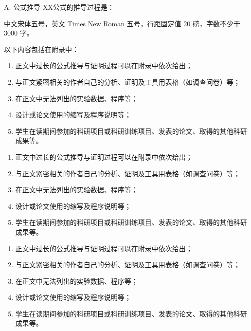 \documentclass{document}
\begin{document}
\clearpage

\printbibliography

\begin{cquappendix}{A: 公式推导}
    XX公式的推导过程是：
    
    中文宋体五号，英文 Times New Roman 五号，行距固定值 20 磅，字数不少于 3000 字。
    
    以下内容包括在附录中：
    \begin{enumerate}
        \item 正文中过长的公式推导与证明过程可以在附录中依次给出；
        \item 与正文紧密相关的作者自己的分析、证明及工具用表格（如调查问卷）等；
        \item 在正文中无法列出的实验数据、程序等；
        \item 设计或论文使用的缩写及程序说明等；
        \item 学生在读期间参加的科研项目或科研训练项目、发表的论文、取得的其他科研成果等。
    \end{enumerate}

    \begin{enumerate}
        \item 正文中过长的公式推导与证明过程可以在附录中依次给出；
        \item 与正文紧密相关的作者自己的分析、证明及工具用表格（如调查问卷）等；
        \item 在正文中无法列出的实验数据、程序等；
        \item 设计或论文使用的缩写及程序说明等；
        \item 学生在读期间参加的科研项目或科研训练项目、发表的论文、取得的其他科研成果等。
    \end{enumerate}

    \begin{enumerate}
        \item 正文中过长的公式推导与证明过程可以在附录中依次给出；
        \item 与正文紧密相关的作者自己的分析、证明及工具用表格（如调查问卷）等；
        \item 在正文中无法列出的实验数据、程序等；
        \item 设计或论文使用的缩写及程序说明等；
        \item 学生在读期间参加的科研项目或科研训练项目、发表的论文、取得的其他科研成果等。
    \end{enumerate}


\end{cquappendix}
\end{document}
